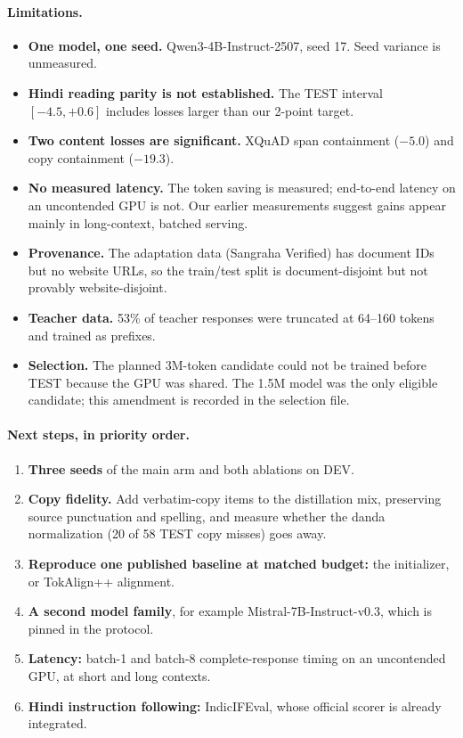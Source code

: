 \documentclass[11pt]{article}
\begin{document}
\paragraph{Limitations.}
\begin{itemize}
  \item \textbf{One model, one seed.} Qwen3-4B-Instruct-2507, seed 17. Seed variance is unmeasured.
  \item \textbf{Hindi reading parity is not established.} The TEST interval $[-4.5, +0.6]$ includes losses larger than our 2-point target.
  \item \textbf{Two content losses are significant.} XQuAD span containment ($-5.0$) and copy containment ($-19.3$).
  \item \textbf{No measured latency.} The token saving is measured; end-to-end latency on an uncontended GPU is not. Our earlier measurements suggest gains appear mainly in long-context, batched serving.
  \item \textbf{Provenance.} The adaptation data (Sangraha Verified) has document IDs but no website URLs, so the train/test split is document-disjoint but not provably website-disjoint.
  \item \textbf{Teacher data.} 53\% of teacher responses were truncated at 64--160 tokens and trained as prefixes.
  \item \textbf{Selection.} The planned 3M-token candidate could not be trained before TEST because the GPU was shared. The 1.5M model was the only eligible candidate; this amendment is recorded in the selection file.
\end{itemize}

\paragraph{Next steps, in priority order.}
\begin{enumerate}
  \item \textbf{Three seeds} of the main arm and both ablations on DEV.
  \item \textbf{Copy fidelity.} Add verbatim-copy items to the distillation mix, preserving source punctuation and spelling, and measure whether the danda normalization (20 of 58 TEST copy misses) goes away.
  \item \textbf{Reproduce one published baseline at matched budget:} the \citet{joshi2026beyond} initializer, or TokAlign++ alignment.
  \item \textbf{A second model family}, for example Mistral-7B-Instruct-v0.3, which is pinned in the protocol.
  \item \textbf{Latency:} batch-1 and batch-8 complete-response timing on an uncontended GPU, at short and long contexts.
  \item \textbf{Hindi instruction following:} IndicIFEval, whose official scorer is already integrated.
\end{enumerate}
\end{document}
